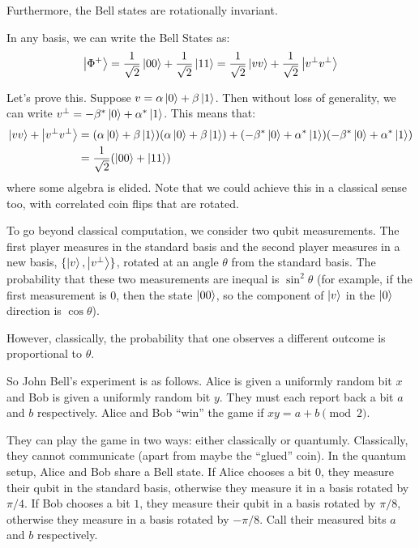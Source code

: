 Furthermore, the Bell states are rotationally invariant. 
\begin{theorem}
    In any basis, we can write the Bell States as:
    \[ \ket{\Phi^+} = \frac{1}{\sqrt{2}} \ket{00} + \frac{1}{\sqrt{2}} \ket{11} = \frac{1}{\sqrt{2}} \ket{vv} + \frac{1}{\sqrt{2}} \ket{v^{\perp} v^{\perp}} \]
\end{theorem}

Let's prove this. Suppose $v = \alpha \ket{0} + \beta \ket{1}$. Then without loss of generality, we can write $v^{\perp} = -\beta^* \ket{0} + \alpha^* \ket{1}$.
This means that:
\begin{align*}
    \ket{vv} + \ket{v^{\perp} v^{\perp}} &= \qty(\alpha \ket{0} + \beta \ket{1})\qty(\alpha \ket{0} + \beta \ket{1}) + \qty(-\beta^* \ket{0} + \alpha^* \ket{1}) \qty(-\beta^* \ket{0} + \alpha^* \ket{1}) \\
    &=  \frac{1}{\sqrt{2}} \qty(\ket{00} + \ket{11})
\end{align*}
where some algebra is elided. Note that we could achieve this
in a classical sense too, with correlated coin flips that are rotated.

To go beyond classical computation, we consider two qubit measurements.
The first player measures in the standard basis and the second player measures in a new basis, $\{ \ket{v}, \ket{v^{\perp}} \}$, rotated at an angle $\theta$ from the standard basis.
The probability that these two measurements are inequal is $\sin^2 \theta$ (for example, if the first measurement is $0$, then the state $\ket{00}$, so the component of $\ket{v}$ in the $\ket{0}$ direction is $\cos \theta$).

However, classically, the probability that one observes a different outcome is proportional to $\theta$.

So John Bell's experiment is as follows. Alice is given a uniformly random bit $x$ and Bob is given a uniformly random bit $y$. They must each report back
a bit $a$ and $b$ respectively.
Alice and Bob ``win'' the game if $xy = a + b \pmod{2}$.

They can play the game in two ways: either classically or quantumly. Classically, they cannot communicate (apart from maybe the ``glued'' coin).
In the quantum setup, 
Alice and Bob share a Bell state.
If Alice chooses a bit $0$, they measure their qubit in the standard basis, otherwise they measure it in a basis rotated by $\pi/4$. If Bob
chooses a bit $1$, they measure their qubit in a basis rotated by $\pi/8$, otherwise they measure in a basis rotated by $-\pi/8$. Call their measured
bits $a$ and $b$ respectively.


